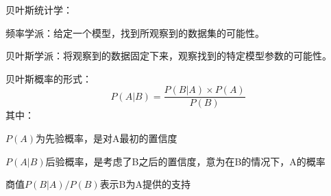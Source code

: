 贝叶斯统计学：
\begin{itemize*}
    \item 频率学派：给定一个模型，找到所观察到的数据集的可能性。
    \item 贝叶斯学派：将观察到的数据固定下来，观察找到的特定模型参数的可能性。
\end{itemize*}


贝叶斯概率的形式：
$$P(A|B)=\frac{P(B|A) \times P(A)}{P(B)}$$
其中：
\begin{itemize*}
    \item $P(A)$为先验概率，是对A最初的置信度
    \item $P(A|B)$后验概率，是考虑了B之后的置信度，意为在B的情况下，A的概率
    \item 商值$P(B|A)/P(B)$表示B为A提供的支持


\end{itemize*}

